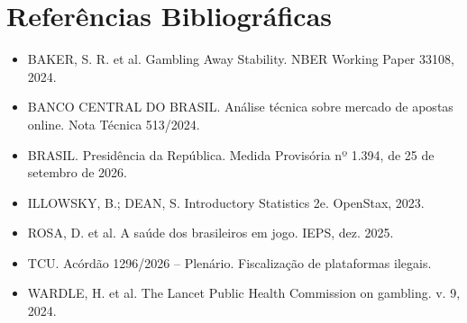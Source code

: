 \documentclass[10pt,a4paper]{article}
\begin{document}
\section{Referências Bibliográficas}
\begin{itemize}
    \item BAKER, S. R. et al. Gambling Away Stability. NBER Working Paper 33108, 2024.
    \item BANCO CENTRAL DO BRASIL. Análise técnica sobre mercado de apostas online. Nota Técnica 513/2024.
    \item BRASIL. Presidência da República. Medida Provisória nº 1.394, de 25 de setembro de 2026.
    \item ILLOWSKY, B.; DEAN, S. Introductory Statistics 2e. OpenStax, 2023.
    \item ROSA, D. et al. A saúde dos brasileiros em jogo. IEPS, dez. 2025.
    \item TCU. Acórdão 1296/2026 – Plenário. Fiscalização de plataformas ilegais.
    \item WARDLE, H. et al. The Lancet Public Health Commission on gambling. v. 9, 2024.
\end{itemize}
\end{document}
